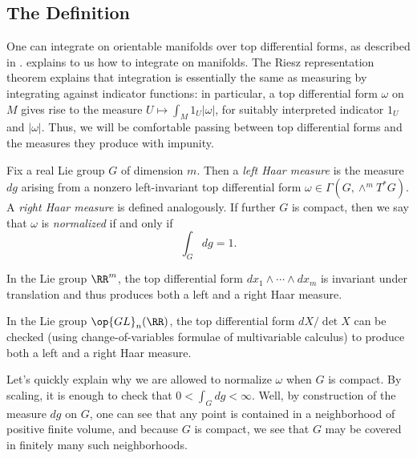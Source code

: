 \documentclass{amsart}
\begin{document}
\subsection{The Definition} \label{subsec:get-haar}
One can integrate on orientable manifolds over top differential forms, as described in \cite[Section~16.1]{lee-manifolds}.
 explains to us how to integrate on manifolds.
The Riesz representation theorem explains that integration is essentially the same as measuring by integrating against indicator functions: in particular, a top differential form $\omega$ on $M$ gives rise to the measure $U\mapsto\int_M1_U\left|\omega\right|$, for suitably interpreted indicator $1_U$ and $\left|\omega\right|$. Thus, we will be comfortable passing between top differential forms and the measures they produce with impunity.
\begin{definition}
	Fix a real Lie group $G$ of dimension $m$. Then a \textit{left Haar measure} is the measure $dg$ arising from a nonzero left-invariant top differential form $\omega\in\Gamma(G,\land^mT^*G)$. A \textit{right Haar measure} is defined analogously. If further $G$ is compact, then we say that $\omega$ is \textit{normalized} if and only if
	\[\int_Gdg=1.\]
\end{definition}
\begin{example} \label{ex:haar-rm}
	In the Lie group $\RR^m$, the top differential form $dx_1\land\cdots\land dx_m$ is invariant under translation and thus produces both a left and a right Haar measure.
\end{example}
\begin{example} \label{ex:haar-gl}
	In the Lie group $\op{GL}_n(\RR)$, the top differential form $dX/\det X$ can be checked (using change-of-variables formulae of multivariable calculus) to produce both a left and a right Haar measure.
\end{example}
\begin{remark}
	Let's quickly explain why we are allowed to normalize $\omega$ when $G$ is compact. By scaling, it is enough to check that $0<\int_Gdg<\infty$. Well, by construction of the measure $dg$ on $G$, one can see that any point is contained in a neighborhood of positive finite volume, and because $G$ is compact, we see that $G$ may be covered in finitely many such neighborhoods.
\end{remark}
\end{document}
